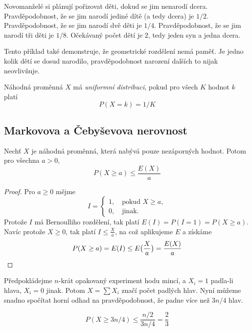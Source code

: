 \begin{example}
    Novomanželé si plánují pořizovat děti, dokud se jim nenarodí dcera.
    Pravděpodobnost, že se jim narodí jediné dítě (a tedy dcera) je $1/2$.
    Pravděpodobnost, že se jim narodí dvě děti je $1/4$.
    Pravděpodobnost, že se jim narodí tři děti je $1/8$.
    Očekávaný počet dětí je $2$, tedy jeden syn a jedna dcera.

    Tento příklad také demonstruje, že geometrické rozdělení nemá paměť.
    Je jedno kolik dětí se dosud narodilo, pravděpodobnost narození
    dalších to nijak neovlivňuje.
\end{example}

\begin{definition}
    Náhodná proměnná $X$ má {\em uniformní distribuci},
    pokud pro všech $K$ hodnot $k$ platí
    \[
        P(X = k) = 1/K
    \]
\end{definition}

\subsection{Markovova a Čebyševova nerovnost}

\begin{theorem}
    Nechť $X$ je náhodná proměnná, která nabývá pouze nezáporných
    hodnot. Potom pro všechna $a > 0$,
    \[
       P(X \geq a) \leq \frac{E(X)}{a}
\]
\end{theorem}

\begin{proof}
    Pro $a \geq 0$ mějme
    \[
        I =
        \begin{cases}
            1, \quad \text{pokud } X \geq a, \\
            0, \quad \text{jinak.}
        \end{cases}
    \]
    Protože $I$ má Bernoulliho rozdělení, tak platí $E(I) = P(I = 1) = P(X \geq a)$.
    Navíc protože $X \geq 0$, tak platí $I \leq \frac{X}{a}$, na což
    aplikujeme $E$ a získáme
    \[
        P(X \geq a) = E(I) \leq E \big (\frac{X}{a} \big ) = \frac{E(X)}{a}
        \qedhere
    \]
\end{proof}

\begin{example}
    Předpokládejme $n$-krát opakovaný experiment hodu mincí,
    a $X_i = 1$ padla-li hlava, $X_i = 0$ jinak.
    Potom $X = \sum X_i$ značí počet padlých hlav. Nyní můžeme snadno
    spočítat horní odhad na pravděpodobnost, že padne více než $3n/4$
    hlav.

    \[
        P(X \geq 3n/4) \leq \frac{n/2}{3n/4} = \frac{2}{3}
    \]
\end{example}

